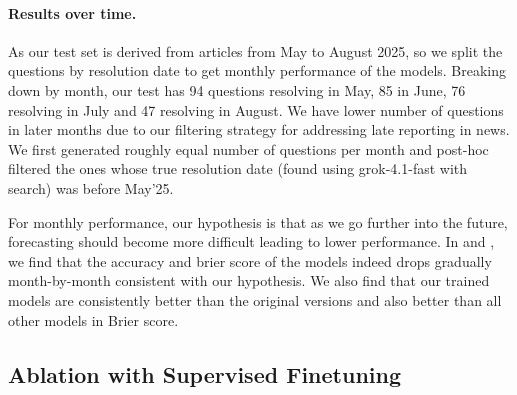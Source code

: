 \paragraph{Results over time.} As our test set is derived from articles from May to August 2025, so we split the questions by resolution date to get monthly performance of the models. Breaking down by month, our test has 94 questions resolving in May, 85 in June, 76 resolving in July and 47 resolving in August. We have lower number of questions in later months due to our filtering strategy for addressing late reporting in news. We first generated roughly equal number of questions per month and post-hoc filtered the ones whose true resolution date (found using grok-4.1-fast with search) was before May'25. 

For monthly performance, our hypothesis is that as we go further into the future, forecasting should become more difficult leading to lower performance. In  and , we find that the accuracy and brier score of the models indeed drops gradually month-by-month consistent with our hypothesis. We also find that our trained models are consistently better than the original versions and also better than all other models in Brier score.




\subsection{Ablation with Supervised Finetuning}
\label{sec:sft_ablation}



